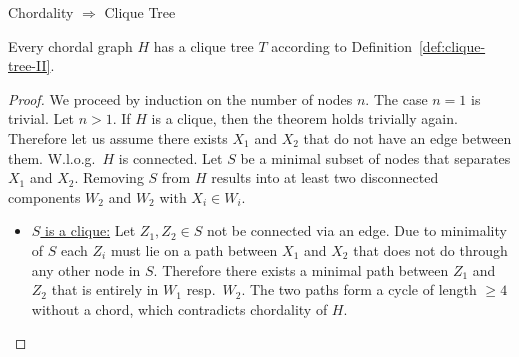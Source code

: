\begin{frame}{Chordality $\Rightarrow$ Clique Tree}
\begin{minipage}[t]{0.24\textwidth}
\end{minipage}
    \pause
    \begin{theorem}
        \label{thm:chordal-graphs-have-clique-trees}
    Every chordal graph $H$ has a clique tree $T$ according to Definition~\ref{def:clique-tree-II}.
    \end{theorem}
    \pause
    \begin{proof}
    We proceed by induction on the number of nodes $n$.
    \pause
    The case $n=1$ is trivial.
    \pause
    Let $n>1$. If $H$ is a clique, then the theorem holds trivially again.
    \pause
    Therefore let us assume there exists $X_1$ and $X_2$ that do not have an edge between them. W.l.o.g.\ $H$ is connected.
    \pause
    Let $S$ be a minimal subset of nodes that separates $X_1$ and $X_2$.
    Removing $S$ from $H$ results into at least two disconnected components $W_2$ and $W_2$ with $X_i \in W_i$.
    \pause
    \begin{itemize}
        \item 
        \underline{$S$ is a clique:} Let $Z_1, Z_2 \in S$ not be connected via an edge.
        \pause
        Due to minimality of $S$ each $Z_i$ must lie on a path between $X_1$ and $X_2$ that does not do through any other node in $S$.
        \pause
        Therefore there exists a minimal path between $Z_1$ and $Z_2$ that is entirely in $W_1$ resp.\ $W_2$.
        \pause
        The two paths form a cycle of length $\geq 4$ without a chord, which contradicts chordality of $H$.
    \end{itemize}
    \end{proof}
\end{frame}

